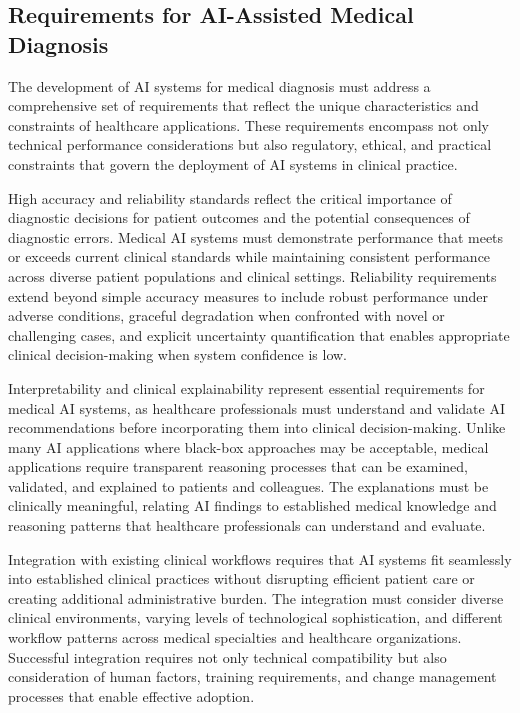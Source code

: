 \subsection{Requirements for AI-Assisted Medical Diagnosis}

The development of AI systems for medical diagnosis must address a comprehensive set of requirements that reflect the unique characteristics and constraints of healthcare applications. These requirements encompass not only technical performance considerations but also regulatory, ethical, and practical constraints that govern the deployment of AI systems in clinical practice.

High accuracy and reliability standards reflect the critical importance of diagnostic decisions for patient outcomes and the potential consequences of diagnostic errors. Medical AI systems must demonstrate performance that meets or exceeds current clinical standards while maintaining consistent performance across diverse patient populations and clinical settings. Reliability requirements extend beyond simple accuracy measures to include robust performance under adverse conditions, graceful degradation when confronted with novel or challenging cases, and explicit uncertainty quantification that enables appropriate clinical decision-making when system confidence is low.

Interpretability and clinical explainability represent essential requirements for medical AI systems, as healthcare professionals must understand and validate AI recommendations before incorporating them into clinical decision-making. Unlike many AI applications where black-box approaches may be acceptable, medical applications require transparent reasoning processes that can be examined, validated, and explained to patients and colleagues. The explanations must be clinically meaningful, relating AI findings to established medical knowledge and reasoning patterns that healthcare professionals can understand and evaluate.

Integration with existing clinical workflows requires that AI systems fit seamlessly into established clinical practices without disrupting efficient patient care or creating additional administrative burden. The integration must consider diverse clinical environments, varying levels of technological sophistication, and different workflow patterns across medical specialties and healthcare organizations. Successful integration requires not only technical compatibility but also consideration of human factors, training requirements, and change management processes that enable effective adoption.

